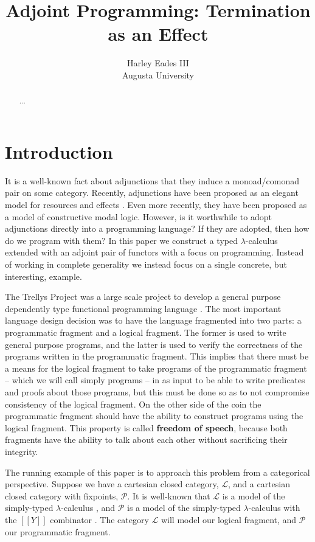 \documentclass{article}
\title{Adjoint Programming: Termination as an Effect}
\author{Harley Eades III\\
  Augusta University}
\newcommand{\cat}[1]{\mathcal{#1}}
\begin{document}
\maketitle

\begin{abstract}
  ... 
\end{abstract}

\section{Introduction}
\label{sec:introduction}

It is a well-known fact about adjunctions that they induce a
monoad/comonad pair on some category.  Recently, adjunctions have been
proposed as an elegant model for resources and effects \cite{??}.
Even more recently, they have been proposed as a model of constructive
modal logic.  However, is it worthwhile to adopt adjunctions directly
into a programming language?  If they are adopted, then how do we
program with them?  In this paper we construct a typed
$\lambda$-calculus extended with an adjoint pair of functors with a
focus on programming.  Instead of working in complete generality we
instead focus on a single concrete, but interesting, example.

The Trellys Project was a large scale project to develop a general
purpose dependently type functional programming language \cite{??}.
The most important language design decision was to have the language
fragmented into two parts: a programmatic fragment and a logical
fragment.  The former is used to write general purpose programs, and
the latter is used to verify the correctness of the programs written
in the programmatic fragment.  This implies that there must be a means
for the logical fragment to take programs of the programmatic fragment
-- which we will call simply programs -- in as input to be able to
write predicates and proofs about those programs, but this must be
done so as to not compromise consistency of the logical fragment.  On
the other side of the coin the programmatic fragment should have the
ability to construct programs using the logical fragment.  This
property is called \textbf{freedom of speech}, because both fragments
have the ability to talk about each other without sacrificing their
integrity.

The running example of this paper is to approach this problem from a
categorical perspective. Suppose we have a cartesian closed category,
$\cat{L}$, and a cartesian closed category with fixpoints, $\cat{P}$.
It is well-known that $\cat{L}$ is a model of the simply-typed
$\lambda$-calculus \cite{?}, and $\cat{P}$ is a model of the
simply-typed $\lambda$-calculus with the $[[Y]]$ combinator \cite{?}.
The category $\cat{L}$ will model our logical fragment, and $\cat{P}$
our programmatic fragment.
\end{document}
